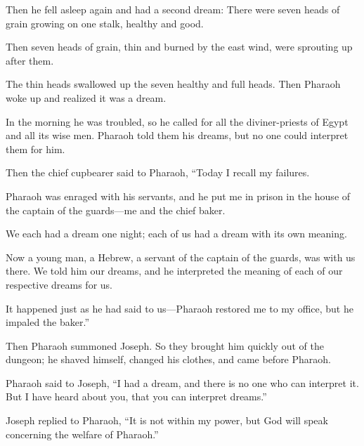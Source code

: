 \begin{scripture}
 Then he fell asleep again and had a second dream: There were seven heads of grain growing on one stalk, healthy and good.
 Then seven heads of grain, thin and burned by the east wind, were sprouting up after them.
 The thin heads swallowed up the seven healthy and full heads. Then Pharaoh woke up and realized it was a dream.
\everypar{}

 In the morning he was troubled, so he called for all the diviner-priests of Egypt and all its wise men. Pharaoh told them his dreams, but no one could interpret them for him.
 Then the chief cupbearer said to Pharaoh, ``Today I recall my failures.
 Pharaoh was enraged with his servants, and he put me in prison in the house of the captain of the guards---me and the chief baker.
 We each had a dream one night; each of us had a dream with its own meaning.
 Now a young man, a Hebrew, a servant of the captain of the guards, was with us there. We told him our dreams, and he interpreted the meaning of each of our respective dreams for us.
 It happened just as he had said to us---Pharaoh restored me to my office, but he impaled the baker.''
\everypar{}

 Then Pharaoh summoned Joseph. So they brought him quickly out of the dungeon; he shaved himself, changed his clothes, and came before Pharaoh.
 Pharaoh said to Joseph, ``I had a dream, and there is no one who can interpret it. But I have heard about you, that you can interpret dreams.''
 Joseph replied to Pharaoh, ``It is not within my power, but God will speak concerning the welfare of Pharaoh.''
\everypar{}


\end{scripture}
